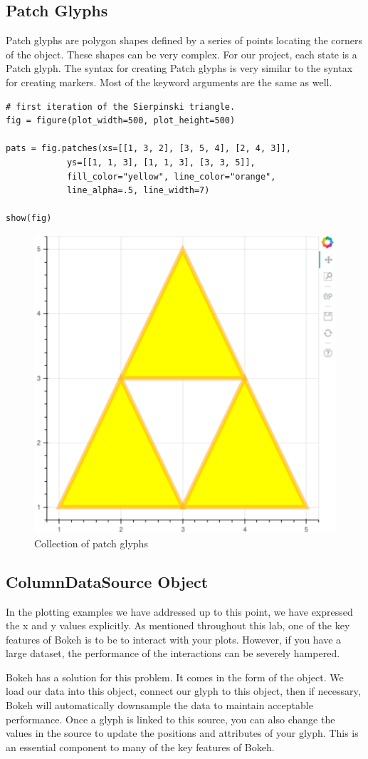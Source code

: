\subsection*{Patch Glyphs}
Patch glyphs are polygon shapes defined by a series of points locating the
corners of the object. These shapes can be very complex. For our project, each
state is a Patch glyph. The syntax for creating Patch glyphs is very similar to
the syntax for creating markers. Most of the keyword arguments are the same as
well.

\begin{lstlisting}
# first iteration of the Sierpinski triangle.
fig = figure(plot_width=500, plot_height=500)

pats = fig.patches(xs=[[1, 3, 2], [3, 5, 4], [2, 4, 3]],
            ys=[[1, 1, 3], [1, 1, 3], [3, 3, 5]],
            fill_color="yellow", line_color="orange",
            line_alpha=.5, line_width=7)

show(fig)
\end{lstlisting}

\begin{figure}
    \centering
        \includegraphics[width=.4\linewidth]{BokehFigs/triforce.pdf}
        \caption{Collection of patch glyphs}
        \label{fig:circles}
\end{figure}

\subsection*{ColumnDataSource Object}
In the plotting examples we have addressed up to this point, we have expressed
the x and y values explicitly. As mentioned throughout this lab, one of the key
features of Bokeh is to be to interact with your plots. However, if you have
a large dataset, the performance of the interactions can be severely hampered.

Bokeh has a solution for this problem. It comes in the form of the
 object. We load our data into this object, connect our
glyph to this object, then if necessary, Bokeh will automatically downsample the
data to maintain acceptable performance. Once a glyph is linked to this source,
you can also change the values in the source to update the positions and attributes
of your glyph. This is an essential component to many of the key features of
Bokeh.

